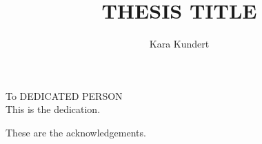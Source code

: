\documentclass[masters]{ucbthesis}
\begin{document}

\title{THESIS TITLE}
\author{Kara Kundert}

\maketitle
\approvalpage
\copyrightpage



\begin{frontmatter}

\begin{dedication}
\null\vfil
\begin{center}
To DEDICATED PERSON\\\vspace{12pt}
This is the dedication.
\end{center}
\vfil\null
\end{dedication}


\tableofcontents
\clearpage
\listoffigures
\clearpage

\begin{acknowledgements}
 These are the acknowledgements.

\end{acknowledgements}

\end{frontmatter}

\pagestyle{headings}









\appendix


{}


\end{document}
